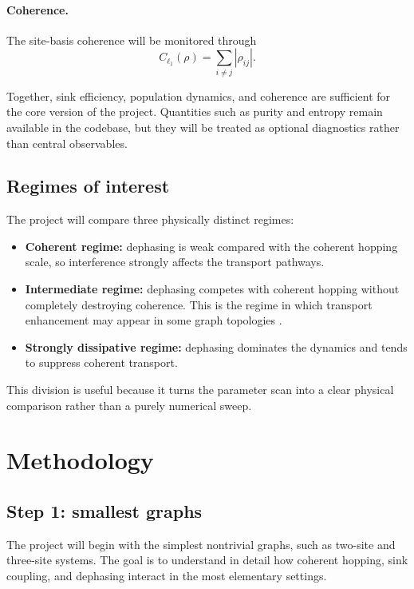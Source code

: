 \documentclass[11pt,a4paper]{article}
\begin{document}
\paragraph{Coherence.}
The site-basis coherence will be monitored through
\begin{equation}
C_{\ell_1}(\rho)=\sum_{i\neq j}|\rho_{ij}|.
\label{eq:coherence}
\end{equation}

Together, sink efficiency, population dynamics, and coherence are sufficient for
the core version of the project. Quantities such as purity and entropy remain
available in the codebase, but they will be treated as optional diagnostics
rather than central observables.

\subsection{Regimes of interest}

The project will compare three physically distinct regimes:
\begin{itemize}
  \item \textbf{Coherent regime:} dephasing is weak compared with the coherent
  hopping scale, so interference strongly affects the transport pathways.
  \item \textbf{Intermediate regime:} dephasing competes with coherent hopping
  without completely destroying coherence. This is the regime in which
  transport enhancement may appear in some graph topologies
  \citep{plenio_huelga_2008,coates_2021,coates_2023,jacob_2024}.
  \item \textbf{Strongly dissipative regime:} dephasing dominates the
  dynamics and tends to suppress coherent transport.
\end{itemize}

This division is useful because it turns the parameter scan into a clear
physical comparison rather than a purely numerical sweep.

\section{Methodology}

\subsection{Step 1: smallest graphs}

The project will begin with the simplest nontrivial graphs, such as two-site and
three-site systems. The goal is to understand in detail how coherent hopping,
sink coupling, and dephasing interact in the most elementary settings.
\end{document}
